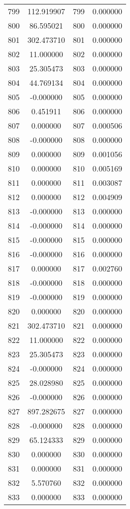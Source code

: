 \documentclass[12pt]{article}
\begin{document}
\begin{longtable}{@{}cccc@{}}
799 & 112.919907 & 799 & 0.000000 \\
800 & 86.595021 & 800 & 0.000000 \\
801 & 302.473710 & 801 & 0.000000 \\
802 & 11.000000 & 802 & 0.000000 \\
803 & 25.305473 & 803 & 0.000000 \\
804 & 44.769134 & 804 & 0.000000 \\
805 & -0.000000 & 805 & 0.000000 \\
806 & 0.451911 & 806 & 0.000000 \\
807 & 0.000000 & 807 & 0.000506 \\
808 & -0.000000 & 808 & 0.000000 \\
809 & 0.000000 & 809 & 0.001056 \\
810 & 0.000000 & 810 & 0.005169 \\
811 & 0.000000 & 811 & 0.003087 \\
812 & 0.000000 & 812 & 0.004909 \\
813 & -0.000000 & 813 & 0.000000 \\
814 & -0.000000 & 814 & 0.000000 \\
815 & -0.000000 & 815 & 0.000000 \\
816 & -0.000000 & 816 & 0.000000 \\
817 & 0.000000 & 817 & 0.002760 \\
818 & -0.000000 & 818 & 0.000000 \\
819 & -0.000000 & 819 & 0.000000 \\
820 & 0.000000 & 820 & 0.000000 \\
821 & 302.473710 & 821 & 0.000000 \\
822 & 11.000000 & 822 & 0.000000 \\
823 & 25.305473 & 823 & 0.000000 \\
824 & -0.000000 & 824 & 0.000000 \\
825 & 28.028980 & 825 & 0.000000 \\
826 & -0.000000 & 826 & 0.000000 \\
827 & 897.282675 & 827 & 0.000000 \\
828 & -0.000000 & 828 & 0.000000 \\
829 & 65.124333 & 829 & 0.000000 \\
830 & 0.000000 & 830 & 0.000000 \\
831 & 0.000000 & 831 & 0.000000 \\
832 & 5.570760 & 832 & 0.000000 \\
833 & 0.000000 & 833 & 0.000000 \\

\end{longtable}
\end{document}
